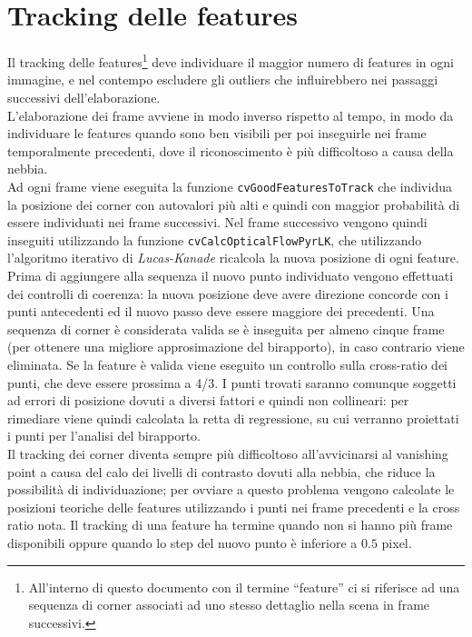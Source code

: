 \documentclass[12pt]{report}
\begin{document}
\section{Tracking delle features}


\noindent Il tracking delle features\footnote{All'interno di questo documento con il termine ``feature'' ci si riferisce ad una sequenza di corner associati ad uno stesso dettaglio nella scena in frame successivi.} deve individuare il maggior numero di features in ogni immagine, e nel contempo escludere gli outliers che influirebbero nei passaggi successivi dell'elaborazione.\\
L'elaborazione dei frame avviene in modo inverso rispetto al tempo, in modo da individuare le features quando sono ben visibili per poi inseguirle nei frame temporalmente precedenti, dove il riconoscimento \`e pi\`u difficoltoso a causa della nebbia.\\

\noindent Ad ogni frame viene eseguita la funzione \verb|cvGoodFeaturesToTrack| che individua la posizione dei corner con autovalori pi\`u alti e quindi con maggior probabilit\`a di essere individuati nei frame successivi. Nel frame successivo vengono quindi inseguiti utilizzando la funzione \verb|cvCalcOpticalFlowPyrLK|, che utilizzando l'algoritmo iterativo di \emph{Lucas-Kanade} ricalcola la nuova posizione di ogni feature.\\

\noindent Prima di aggiungere alla sequenza il nuovo punto individuato vengono effettuati dei controlli di coerenza: la nuova posizione deve avere direzione concorde con i punti antecedenti ed il nuovo passo deve essere maggiore dei precedenti. Una sequenza di corner \`e considerata valida se \`e inseguita per almeno cinque frame (per ottenere una migliore approsimazione del birapporto), in caso contrario viene eliminata. Se la feature \`e valida viene eseguito un controllo sulla cross-ratio dei punti, che deve essere prossima a 4/3. I punti trovati saranno comunque soggetti ad errori di posizione dovuti a diversi fattori e quindi non collineari: per rimediare viene quindi calcolata la retta di regressione, su cui verranno proiettati i punti per l'analisi del birapporto.\\

\noindent Il tracking dei corner diventa sempre pi\`u difficoltoso all'avvicinarsi al vanishing point a causa del calo dei livelli di contrasto dovuti alla nebbia, che riduce la possibilit\`a di individuazione; per ovviare a questo problema vengono calcolate le posizioni teoriche delle features utilizzando i punti nei frame precedenti e la cross ratio nota. Il tracking di una feature ha termine quando non si hanno pi\`u frame disponibili oppure quando lo step del nuovo punto \`e inferiore a $0.5$ pixel.
\end{document}
